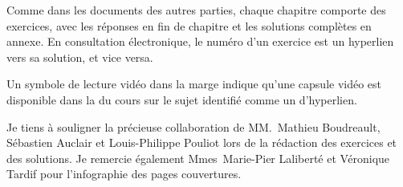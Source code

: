 Comme dans les documents des autres parties, chaque chapitre comporte
des exercices, avec les réponses en fin de chapitre et les solutions
complètes en annexe. En consultation électronique, le numéro d'un
exercice est un hyperlien vers sa solution, et vice versa.

Un symbole de lecture vidéo dans la marge indique qu'une capsule vidéo
est disponible dans la %
du cours sur le sujet identifié comme un d'hyperlien.

Je tiens à souligner la précieuse collaboration de MM.~Mathieu
Boudreault, Sébastien Auclair et Louis-Philippe Pouliot lors de la
rédaction des exercices et des solutions. Je remercie également
Mmes~Marie-Pier Laliberté et Véronique Tardif pour l'infographie des
pages couvertures.

